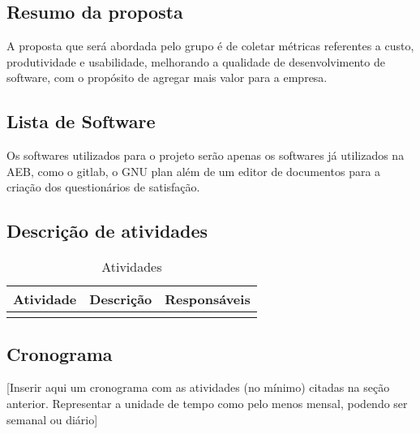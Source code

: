 \subsection{Resumo da proposta}
	A proposta que será abordada pelo grupo é de coletar métricas referentes a custo, produtividade e usabilidade, melhorando a qualidade de desenvolvimento de software, com o propósito de agregar mais valor para a empresa.

\subsection{Lista de Software}
  Os softwares utilizados para o projeto serão apenas os softwares já utilizados na AEB, como o gitlab, o GNU plan além de um editor de documentos para a criação dos questionários de satisfação.

\subsection{Descrição de atividades}

\begin{table}[H]
\centering
\begin{tabular}{|p{2cm}|p{5cm}|p{3cm}|}
\hline
	\textbf{Atividade} &
	\textbf{Descrição} &
  \textbf{Responsáveis}
	\\ \hline
	\\ \hline
\end{tabular}
\caption{Atividades}
\label{tab:atividades}
\end{table}

\subsection{Cronograma}
  [Inserir aqui um cronograma com as atividades (no mínimo) citadas na seção anterior. Representar a unidade de tempo como pelo menos mensal, podendo ser semanal ou diário]
